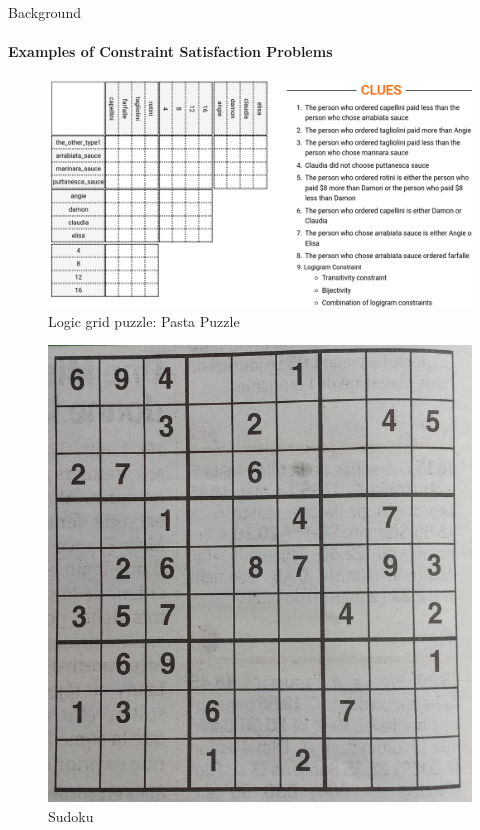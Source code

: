 \documentclass[handout]{beamer}
\begin{document}
	\begin{frame}{Background}
	\framesubtitle{Examples of Constraint Satisfaction Problems}
		\begin{minipage}[t]{0.6\textwidth}
			\begin{figure}[h]
				\includegraphics[width=\textwidth]{logic_puzzle.png}
				\caption{Logic grid puzzle: Pasta Puzzle}
			\end{figure}
		\end{minipage}
	\hfill
			\begin{minipage}[t]{0.29\textwidth}
			\begin{figure}[h]
				\includegraphics[width=\textwidth]{sudoku.jpg}
				\caption{Sudoku}
			\end{figure}
		\end{minipage}
	\end{frame}
\end{document}
